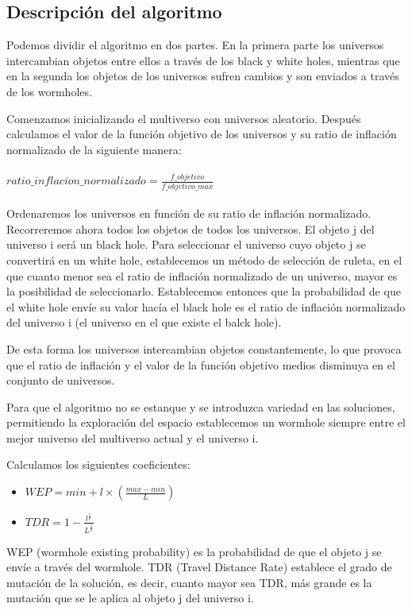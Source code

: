 \subsection{Descripción del algoritmo}
Podemos dividir el algoritmo en dos partes. En la primera parte los universos intercambian objetos entre ellos a través de los black y white holes, mientras que en la segunda los objetos de los universos sufren cambios y son enviados a través de los wormholes.

Comenzamos inicializando el multiverso con universos aleatorio. Después calculamos el valor de la función objetivo de los universos y su ratio de inflación normalizado de la siguiente manera:\\\\ $ ratio\_inflacion\_normalizado = \frac{f\_objetivo}{f\_objetivo\_max} $ \\\\

Ordenaremos los universos en función de su ratio de inflación normalizado.
Recorreremos ahora todos los objetos de todos los universos. El objeto j del universo i será un black hole. Para seleccionar el universo cuyo objeto j se convertirá en un white hole, establecemos un método de selección de ruleta, en el que cuanto menor sea el ratio de inflación normalizado de un universo, mayor es la posibilidad de seleccionarlo. Establecemos entonces que la probabilidad de que el white hole envíe su valor hacía el black hole es el ratio de inflación normalizado del universo i (el universo en el que existe el balck hole).

De esta forma los universos intercambian objetos constantemente, lo que provoca que el ratio de inflación y el valor de la función objetivo medios disminuya en el conjunto de universos.

Para que el algoritmo no se estanque y se introduzca variedad en las soluciones, permitiendo la exploración del espacio establecemos un wormhole siempre entre el mejor universo del multiverso actual y el universo i.

Calculamos los siguientes coeficientes:
\begin{itemize}
   \item $WEP = min + l \times (\frac{max - min}{L})$
   \item $TDR = 1 - \frac{l^{\frac{1}{p}}}{L^{\frac{1}{p}}}$
\end{itemize}
WEP (wormhole existing probability) es la probabilidad de que el objeto j se envíe a través del wormhole.
TDR (Travel Distance Rate) establece el grado de mutación de la solución, es decir, cuanto mayor sea TDR, más grande es la mutación que se le aplica al objeto j del universo i.


